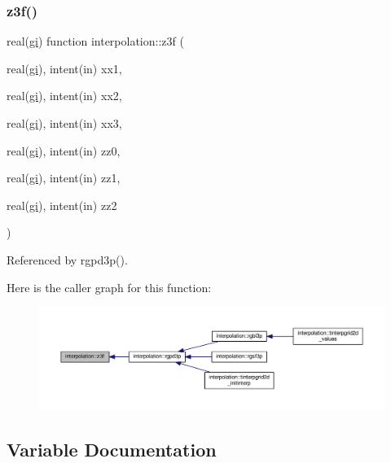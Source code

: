 \subsubsection{\texorpdfstring{z3f()}{z3f()}}
{\footnotesize\ttfamily real(\mbox{\hyperlink{namespaceinterpolation_a7242dea48715e8170bae81efe12c64be}{gi}}) function interpolation\+::z3f (\begin{DoxyParamCaption}\item[{real(\mbox{\hyperlink{namespaceinterpolation_a7242dea48715e8170bae81efe12c64be}{gi}}), intent(in)}]{xx1,  }\item[{real(\mbox{\hyperlink{namespaceinterpolation_a7242dea48715e8170bae81efe12c64be}{gi}}), intent(in)}]{xx2,  }\item[{real(\mbox{\hyperlink{namespaceinterpolation_a7242dea48715e8170bae81efe12c64be}{gi}}), intent(in)}]{xx3,  }\item[{real(\mbox{\hyperlink{namespaceinterpolation_a7242dea48715e8170bae81efe12c64be}{gi}}), intent(in)}]{zz0,  }\item[{real(\mbox{\hyperlink{namespaceinterpolation_a7242dea48715e8170bae81efe12c64be}{gi}}), intent(in)}]{zz1,  }\item[{real(\mbox{\hyperlink{namespaceinterpolation_a7242dea48715e8170bae81efe12c64be}{gi}}), intent(in)}]{zz2 }\end{DoxyParamCaption})}



Referenced by rgpd3p().

Here is the caller graph for this function\+:
\nopagebreak
\begin{figure}[H]
\begin{center}
\leavevmode
\includegraphics[width=350pt]{namespaceinterpolation_aa80e5ef1a8e693b3c094f26f166cebf2_icgraph}
\end{center}
\end{figure}


\subsection{Variable Documentation}
\mbox{\label{namespaceinterpolation_a7242dea48715e8170bae81efe12c64be}} 
